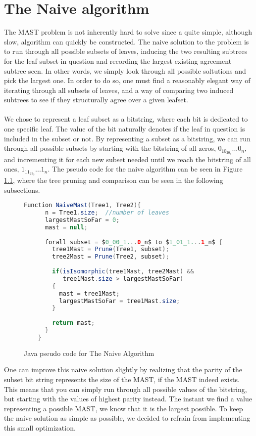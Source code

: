 \chapter{The Naive algorithm}
The MAST problem is not inherently hard to solve since a quite simple, although slow, algorithm can quickly be constructed. The naive solution to the problem is to run through all possible subsets of leaves, inducing the two resulting subtrees for the leaf subset in question and recording the largest existing agreement subtree seen. In other words, we simply look through all possible soltutions and pick the largest one. In order to do so, one must find a reasonably elegant way of iterating through all subsets of leaves, and a way of comparing two induced subtrees to see if they structurally agree over a given leafset. 
\\
\\
We chose to represent a leaf subset as a bitstring, where each bit is dedicated to one specific leaf. The value of the bit naturally denotes if the leaf in question is included in the subset or not. By representing a subset as a bitstring, we can run through all possible subsets by starting with the bitstring of all zeros, $0_10_20_3...0_n$, and incrementing it for each new subset needed until we reach the bitstring of all ones, $1_11_21_3...1_n$. The pseudo code for the naive algorithm can be seen in Figure \ref{Code:Naive1}, where the tree pruning and comparison can be seen in the following subsections.

\begin{figure}
	\begin{lstlisting}[language=Java, mathescape]
	Function NaiveMast(Tree1, Tree2){
	  n = Tree1.size;  //number of leaves
	  largestMastSoFar = 0;
	  mast = null;
	  
	  forall subset = $0_00_1...0_n$ to $1_01_1...1_n$ {
	    tree1Mast = Prune(Tree1, subset);
	    tree2Mast = Prune(Tree2, subset);
	    
	    if(isIsomorphic(tree1Mast, tree2Mast) && 
	       tree1Mast.size > largestMastSoFar) 
	    {
	      mast = tree1Mast;
	      largestMastSoFar = tree1Mast.size;
	    }
	    
	    return mast;
	  }
	}
	\end{lstlisting}
	\caption{Java pseudo code for The Naive Algorithm}
	\label{Code:Naive1}
\end{figure}
One can improve this naive solution slightly by realizing that the parity of the subset bit string represents the size of the MAST, if the MAST indeed exists. This means that you can simply run through all possible values of the bitstring, but starting with the values of highest parity instead. The instant we find a value representing a possible MAST, we know that it is the largest possible. To keep the naive solution as simple as possible, we decided to refrain from implementing this small optimization.

